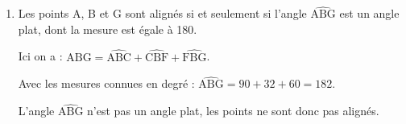 \begin{enumerate}
	On peut donc calculer le cosinus de l'angle :\quad $\cos\left(\widehat{\mathrm{FBG}}\right) = \dfrac{\text{côté adjacent}}{\text{hypoténuse}} = \dfrac{\mathrm{BG}}{\mathrm{BF}} = \dfrac{2}{4} = \dfrac{1}{2}$.

	On a donc : \quad $\widehat{\mathrm{FBG}} = \arccos\left(\dfrac{1}{2}\right) = 60\degres$.

	\item Les points A, B et G sont alignés si et seulement si l'angle $\widehat{\mathrm{ABG}}$ est un angle plat, dont la mesure est égale à 180\degres.

	Ici on a : \quad $\widehat{\mathrm{ABG}} = \widehat{\mathrm{ABC}} + \widehat{\mathrm{CBF}}+\widehat{\mathrm{FBG}}$.

	Avec les mesures connues en degré : \quad $\widehat{\mathrm{ABG}} = 90 + 32 + 60 = 182$.

	L'angle $\widehat{\mathrm{ABG}}$ n'est pas un angle plat, les points ne sont donc pas alignés.
\end{enumerate}


